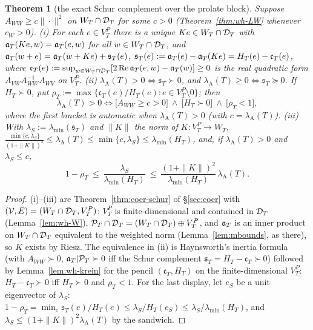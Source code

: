 \documentclass[11pt]{amsart}
\newtheorem{theorem}{Theorem}[section]
\theoremstyle{definition}
\theoremstyle{remark}
\newcommand{\Rel}{\operatorname{Re}}
\newcommand{\PT}{\mathcal P_T}
\begin{document}
\begin{theorem}[the exact Schur complement over the prolate block]\label{thm:wh-schur}
Suppose $A_{WW}\ge c\|\cdot\|^2$ on $W_T\cap\mathcal D_T$ for some $c>0$ (Theorem~\ref{thm:wh-LW} whenever $c_W>0$).
\emph{(i)} For each $e\in V_T^P$ there is a unique $Ke\in W_T\cap\mathcal D_T$ with $\mathfrak a_T(Ke,w)=\mathfrak a_T(e,w)$ for all $w\in W_T\cap\mathcal D_T$, and
$\mathfrak a_T(w+e)=\mathfrak a_T(w+Ke)+\mathfrak s_T(e)$, $\mathfrak s_T(e):=\mathfrak a_T(e)-\mathfrak a_T(Ke)=H_T(e)-\mathfrak c_T(e)$, where
$\mathfrak c_T(e):=\sup_{w\in W_T\cap\DT}[2\Rel\fa(e,w)-\fa(w)]\ge0$ is the real quadratic form $A_{VW}A_{WW}^{-1}A_{WV}$ on $V_T^P$.
\emph{(ii)} $\lambda_{\mathrm A}(T)>0\iff\mathfrak s_T\succ0$, and $\lambda_{\mathrm A}(T)\ge0\iff\mathfrak s_T\succeq0$. If $H_T\succ0$,
put $\rho_T:=\max\{\mathfrak c_T(e)/H_T(e):e\in V_T^P\setminus0\}$; then
\[
\lambda_{\mathrm A}(T)>0\iff\big[A_{WW}\ge c>0\big]\ \wedge\ \big[H_T\succ0\big]\ \wedge\ \big[\rho_T<1\big],
\]
where the first bracket is automatic when $\lambda_{\mathrm A}(T)>0$ (with $c=\lambda_{\mathrm A}(T)$).
\emph{(iii)} With $\lambda_S:=\lambda_{\min}(\mathfrak s_T)$ and $\|K\|$ the norm of $K:V_T^P\to W_T$,
$\frac{\min\{c,\lambda_S\}}{(1+\|K\|)^2}\le\lambda_{\mathrm A}(T)\le\min\{c,\lambda_S\}\le\lambda_{\min}(H_T)$, and, if
$\lambda_{\mathrm A}(T)>0$ and $\lambda_S\le c$,
\[
1-\rho_T\ \le\ \frac{\lambda_S}{\lambda_{\min}(H_T)}\ \le\ \frac{(1+\|K\|)^2}{\lambda_{\min}(H_T)}\,\lambda_{\mathrm A}(T).
\]
\end{theorem}
\begin{proof}
(i)--(iii) are Theorem~\ref{thm:coer-schur} of \S\ref{sec:coer} with $(\mathcal V,E)=(W_T\cap\mathcal D_T,V_T^P)$: $V_T^P$ is
finite-dimensional and contained in $\mathcal D_T$ (Lemma~\ref{lem:wh-W}), $\PT\cap\DT=(W_T\cap\DT)\oplus V_T^P$, and $\mathfrak a_T$ is an
inner product on $W_T\cap\mathcal D_T$ equivalent to the weighted norm (Lemma~\ref{lem:mbounds}, as there), so $K$ exists by Riesz.
The equivalence in (ii) is Haynsworth's inertia formula (with $A_{WW}\succ0$, $\fa|\PT\succ0$ iff the Schur complement
$\mathfrak s_T=H_T-\mathfrak c_T\succ0$) followed by Lemma~\ref{lem:wh-krein} for the pencil $(\mathfrak c_T,H_T)$ on the
finite-dimensional $V_T^P$: $H_T-\mathfrak c_T\succ0$ iff $H_T\succ0$ and $\rho_T<1$. For the last display, let $e_S$ be a unit
eigenvector of $\lambda_S$: $1-\rho_T=\min_e\mathfrak s_T(e)/H_T(e)\le\lambda_S/H_T(e_S)\le\lambda_S/\lambda_{\min}(H_T)$, and
$\lambda_S\le(1+\|K\|)^2\lambda_{\mathrm A}(T)$ by the sandwich.
\end{proof}
\end{document}
